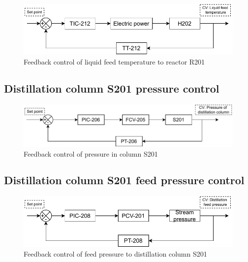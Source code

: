     \begin{figure}[H]
        \centering
        \includegraphics[width=0.9\linewidth]{chapters/4-operation-control/4-Figures/H202-TC.pdf}
        \caption{Feedback control of liquid feed temperature to reactor R201}
        \label{fig:H202-TC}
    \end{figure} 

\subsection{Distillation column S201 pressure control}

    \begin{figure}[H]
        \centering
        \includegraphics[width=0.9\linewidth]{chapters/4-operation-control/4-Figures/S201-PC.pdf}
        \caption{Feedback control of pressure in column S201}
        \label{fig:S201-PC}
    \end{figure} 

\subsection{Distillation column S201 feed pressure control}

    \begin{figure}[H]
        \centering
        \includegraphics[width=0.9\linewidth]{chapters/4-operation-control/4-Figures/PCV201-PC.pdf}
        \caption{Feedback control of feed pressure to distillation column S201}
        \label{fig:PCV201-PC}
    \end{figure}     

